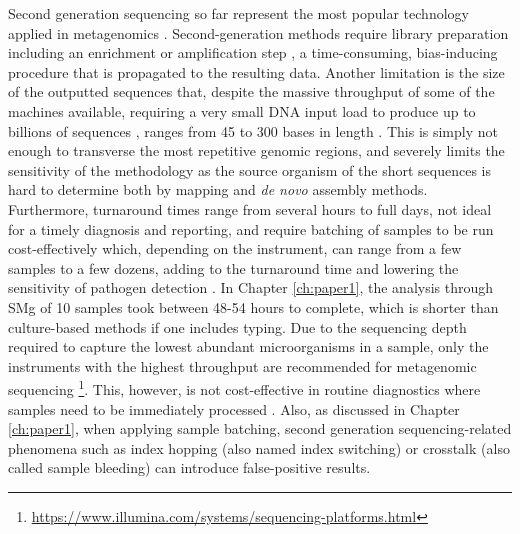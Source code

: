 Second generation sequencing so far represent the most popular technology applied in metagenomics \citep{rossen_practical_2018, loman_twenty_2015, loman_high-throughput_2012, schuele_future_2021}. Second-generation methods require library preparation including an enrichment or amplification step \citep{hagemann_overview_2015}, a time-consuming, bias-inducing procedure that is propagated to the resulting data. Another limitation is the size of the outputted sequences that, despite the massive throughput of some of the machines available, requiring a very small \ac{DNA} input load to produce up to billions of sequences \citep{loman_twenty_2015}, ranges from 45 to 300 bases in length \citep{loman_performance_2012, ari_next-generation_2016}. This is simply not enough to transverse the most repetitive genomic regions, and severely limits the sensitivity of the methodology as the source organism of the short sequences is hard to determine both by mapping and \textit{de novo} assembly methods. Furthermore, turnaround times range from several hours to full days, not ideal for a timely diagnosis and reporting, and require batching of samples to be run cost-effectively which, depending on the instrument, can range from a few samples to a few dozens, adding to the turnaround time and lowering the sensitivity of pathogen detection \citep{greninger_challenge_2018, schuele_future_2021}. In Chapter \ref{ch:paper1}, the analysis through \ac{SMg} of 10 samples took between 48-54 hours to complete, which is shorter than culture-based methods if one includes typing. Due to the sequencing depth required to capture the lowest abundant microorganisms in a sample, only the instruments with the highest throughput are recommended for metagenomic sequencing \footnote{ \url{https://www.illumina.com/systems/sequencing-platforms.html}}. This, however, is not cost-effective in routine diagnostics where samples need to be immediately processed \citep{rossen__2018}. Also, as discussed in Chapter \ref{ch:paper1}, when applying sample batching, second generation sequencing-related phenomena such as index hopping (also named index switching) or crosstalk (also called sample bleeding) can introduce false-positive results.

